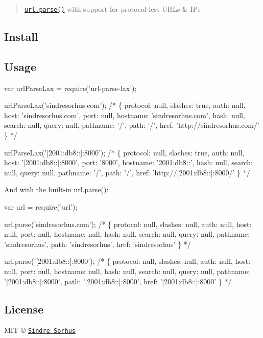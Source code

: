 \begin{quote}
\href{https://nodejs.org/docs/latest/api/url.html#url_url_parse_urlstr_parsequerystring_slashesdenotehost}{\tt {\ttfamily url.\+parse()}} with support for protocol-\/less U\+R\+Ls \& I\+Ps \end{quote}


\subsection*{Install}




\subsection*{Usage}


\begin{DoxyCode}
var urlParseLax = require('url-parse-lax');

urlParseLax('sindresorhus.com');
/*
\{
  protocol: null,
  slashes: true,
  auth: null,
  host: 'sindresorhus.com',
  port: null,
  hostname: 'sindresorhus.com',
  hash: null,
  search: null,
  query: null,
  pathname: '/',
  path: '/',
  href: 'http://sindresorhus.com/'
\}
*/

urlParseLax('[2001:db8::]:8000');
/*
\{
  protocol: null,
  slashes: true,
  auth: null,
  host: '[2001:db8::]:8000',
  port: '8000',
  hostname: '2001:db8::',
  hash: null,
  search: null,
  query: null,
  pathname: '/',
  path: '/',
  href: 'http://[2001:db8::]:8000/'
\}
*/
\end{DoxyCode}


And with the built-\/in {\ttfamily url.\+parse()}\+:


\begin{DoxyCode}
var url = require('url');

url.parse('sindresorhus.com');
/*
\{
  protocol: null,
  slashes: null,
  auth: null,
  host: null,
  port: null,
  hostname: null,
  hash: null,
  search: null,
  query: null,
  pathname: 'sindresorhus',
  path: 'sindresorhus',
  href: 'sindresorhus'
\}
*/

url.parse('[2001:db8::]:8000');
/*
\{
  protocol: null,
  slashes: null,
  auth: null,
  host: null,
  port: null,
  hostname: null,
  hash: null,
  search: null,
  query: null,
  pathname: '[2001:db8::]:8000',
  path: '[2001:db8::]:8000',
  href: '[2001:db8::]:8000'
\}
*/
\end{DoxyCode}


\subsection*{License}

M\+IT © \href{http://sindresorhus.com}{\tt Sindre Sorhus} 